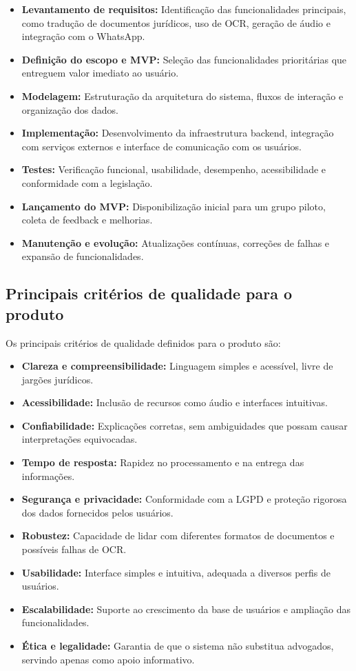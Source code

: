 \documentclass{article}
\begin{document}
\begin{itemize}
    \item \textbf{Levantamento de requisitos:} Identificação das funcionalidades principais, como tradução de documentos jurídicos, uso de OCR, geração de áudio e integração com o WhatsApp.
    \item \textbf{Definição do escopo e MVP:} Seleção das funcionalidades prioritárias que entreguem valor imediato ao usuário.
    \item \textbf{Modelagem:} Estruturação da arquitetura do sistema, fluxos de interação e organização dos dados.
    \item \textbf{Implementação:} Desenvolvimento da infraestrutura backend, integração com serviços externos e interface de comunicação com os usuários.
    \item \textbf{Testes:} Verificação funcional, usabilidade, desempenho, acessibilidade e conformidade com a legislação.
    \item \textbf{Lançamento do MVP:} Disponibilização inicial para um grupo piloto, coleta de feedback e melhorias.
    \item \textbf{Manutenção e evolução:} Atualizações contínuas, correções de falhas e expansão de funcionalidades.
\end{itemize}

\subsection{Principais critérios de qualidade para o produto}

Os principais critérios de qualidade definidos para o produto são:

\begin{itemize}
    \item \textbf{Clareza e compreensibilidade:} Linguagem simples e acessível, livre de jargões jurídicos.
    \item \textbf{Acessibilidade:} Inclusão de recursos como áudio e interfaces intuitivas.
    \item \textbf{Confiabilidade:} Explicações corretas, sem ambiguidades que possam causar interpretações equivocadas.
    \item \textbf{Tempo de resposta:} Rapidez no processamento e na entrega das informações.
    \item \textbf{Segurança e privacidade:} Conformidade com a LGPD e proteção rigorosa dos dados fornecidos pelos usuários.
    \item \textbf{Robustez:} Capacidade de lidar com diferentes formatos de documentos e possíveis falhas de OCR.
    \item \textbf{Usabilidade:} Interface simples e intuitiva, adequada a diversos perfis de usuários.
    \item \textbf{Escalabilidade:} Suporte ao crescimento da base de usuários e ampliação das funcionalidades.
    \item \textbf{Ética e legalidade:} Garantia de que o sistema não substitua advogados, servindo apenas como apoio informativo.
\end{itemize}
\end{document}
